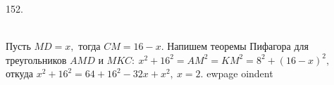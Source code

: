 152. \begin{figure}[ht!]
\end{figure}\\
Пусть $MD=x,$ тогда $CM=16-x.$ Напишем теоремы Пифагора для треугольников $AMD$ и $MKC:\ x^2+16^2=AM^2=KM^2=8^2+(16-x)^2,$ откуда $x^2+16^2=64+16^2-32x+x^2,\ x=2.$
ewpage
oindent
